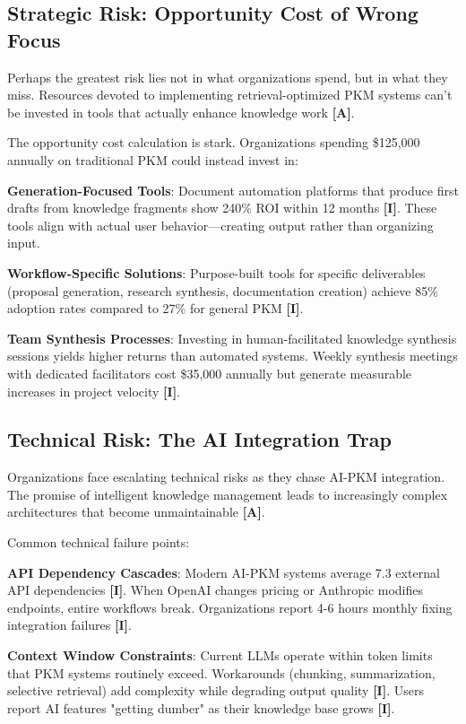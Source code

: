 \documentclass[a4paper,11pt]{article}
\newcommand{\ilabel}{\textbf{\textcolor{icolor}{[I]}}}
\newcommand{\alabel}{\textbf{\textcolor{acolor}{[A]}}}
\begin{document}
\subsection{Strategic Risk: Opportunity Cost of Wrong Focus}

Perhaps the greatest risk lies not in what organizations spend, but in what they miss. Resources devoted to implementing retrieval-optimized PKM systems can't be invested in tools that actually enhance knowledge work \alabel{}.


The opportunity cost calculation is stark. Organizations spending \$125,000 annually on traditional PKM could instead invest in:


\textbf{Generation-Focused Tools}: Document automation platforms that produce first drafts from knowledge fragments show 240\% ROI within 12 months \ilabel{}. These tools align with actual user behavior—creating output rather than organizing input.


\textbf{Workflow-Specific Solutions}: Purpose-built tools for specific deliverables (proposal generation, research synthesis, documentation creation) achieve 85\% adoption rates compared to 27\% for general PKM \ilabel{}.


\textbf{Team Synthesis Processes}: Investing in human-facilitated knowledge synthesis sessions yields higher returns than automated systems. Weekly synthesis meetings with dedicated facilitators cost \$35,000 annually but generate measurable increases in project velocity \ilabel{}.


\subsection{Technical Risk: The AI Integration Trap}

Organizations face escalating technical risks as they chase AI-PKM integration. The promise of intelligent knowledge management leads to increasingly complex architectures that become unmaintainable \alabel{}.


Common technical failure points:


\textbf{API Dependency Cascades}: Modern AI-PKM systems average 7.3 external API dependencies \ilabel{}. When OpenAI changes pricing or Anthropic modifies endpoints, entire workflows break. Organizations report 4-6 hours monthly fixing integration failures \ilabel{}.


\textbf{Context Window Constraints}: Current LLMs operate within token limits that PKM systems routinely exceed. Workarounds (chunking, summarization, selective retrieval) add complexity while degrading output quality \ilabel{}. Users report AI features "getting dumber" as their knowledge base grows \ilabel{}.
\end{document}
